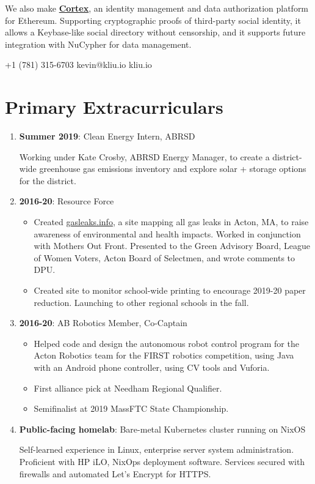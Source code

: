 \documentclass[paper=letter]{tccv}
\begin{document}
We also make \href{https://mycortex.tech}{\textbf{Cortex}}, an identity management and data authorization platform for Ethereum. Supporting cryptographic proofs of third-party social identity, it allows a Keybase-like social directory without censorship, and it supports future integration with NuCypher for data management.

    {+1 (781) 315-6703}
    {kevin@kliu.io}
    {kliu.io}

\section{Primary Extracurriculars}

\begin{enumerate}
     \item \textbf{Summer 2019}: Clean Energy Intern, ABRSD
     
             Working under Kate Crosby, ABRSD Energy Manager, to create a district-wide greenhouse gas emissions inventory and explore solar + storage options for the district.
         \item \textbf{2016-20}: Resource Force
             \begin{itemize}
                \item Created \href{https://gasleaks.info}{gasleaks.info}, a site mapping all gas leaks in Acton, MA, to raise awareness of environmental and health impacts. Worked in conjunction with Mothers Out Front. Presented to the Green Advisory Board, League of Women Voters, Acton Board of Selectmen, and wrote comments to DPU.
                \item Created site to monitor school-wide printing to encourage 2019-20 paper reduction. Launching to other regional schools in the fall.
             \end{itemize}
      
         \item \textbf{2016-20}: AB Robotics Member, Co-Captain
             \begin{itemize}
                \item Helped code and design the autonomous robot control program for the Acton Robotics team for the FIRST robotics competition, using Java with an Android phone controller, using CV tools and Vuforia.
                \item First alliance pick at Needham Regional Qualifier.
                \item Semifinalist at 2019 MassFTC State Championship.
             \end{itemize}
    \item \textbf{Public-facing homelab}: Bare-metal Kubernetes cluster running on NixOS

    Self-learned experience in Linux, enterprise server system administration. Proficient with HP iLO, NixOps deployment software. Services secured with firewalls and automated Let's Encrypt for HTTPS.
     
\end{enumerate}
\end{document}
